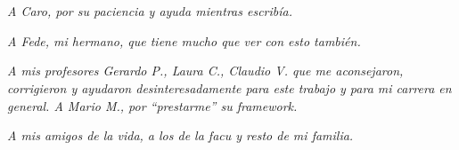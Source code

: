 \ \\
\ \\
\label{pagagrad}
\\
\ \\
\ \\

\ \\

\ \\

\emph{A Caro, por su paciencia y ayuda mientras escrib\'ia.}

\emph{A Fede, mi hermano, que tiene mucho que ver con esto tambi\'en.}

\emph{A mis profesores Gerardo P., Laura C., Claudio V. que me
aconsejaron, corrigieron y ayudaron desinteresadamente para este trabajo y para mi carrera en general. A Mario M., por ``prestarme'' su framework.}

\emph{A mis amigos de la vida, a los de la facu y resto de mi familia.} 

\vfill
\pagebreak

